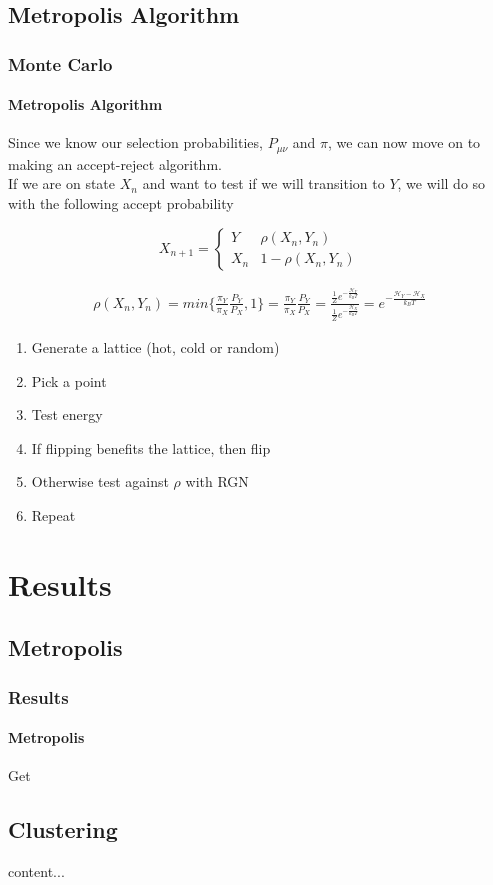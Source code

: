 \documentclass[11pt,notes]{beamer}
\begin{document}
\subsection{Metropolis Algorithm}
\begin{frame}
\frametitle{Monte Carlo}
\framesubtitle{Metropolis Algorithm}
Since we know our selection probabilities, $P_{\mu\nu}$ and $ \pi $, we can now move on to making an accept-reject algorithm.\\
If we are on state $ X_n $ and want to test if we will transition to $ Y $, we will do so with the following accept probability

\begin{equation}
X_{n+1} = 
	\begin{cases}
		Y & \rho(X_n,Y_n) \\
		X_n & 1-\rho(X_n,Y_n)
	\end{cases}
\end{equation}

\begin{multline}
	\rho(X_n,Y_n) = 
	min\bigg\{\frac{\pi_Y}{\pi_X}\frac{P_Y}{P_X},1\bigg\} =
	\frac{\pi_Y}{\pi_X}\frac{P_Y}{P_X} = 
	\frac{\frac{1}{Z}e^{-\frac{\mathcal{H}_Y}{k_B T}}}{\frac{1}{Z}e^{-\frac{\mathcal{H}_X}{k_B T}}} =
	e^{-\frac{\mathcal{H}_Y - \mathcal{H}_X}{k_B T}}
\end{multline}

\end{frame}
\begin{frame}
\begin{enumerate}
	\item Generate a lattice (hot, cold or random)
	\item Pick a point
	\item Test energy
	\item If flipping benefits the lattice, then flip
	\item Otherwise test against $\rho$ with RGN
	\item Repeat
\end{enumerate}
\end{frame}
\section{Results}
\subsection{Metropolis}
\begin{frame}
\frametitle{Results}
\framesubtitle{Metropolis}
Get
\end{frame}

\subsection{Clustering}
\begin{frame}
	content...
\end{frame}
\end{document}

